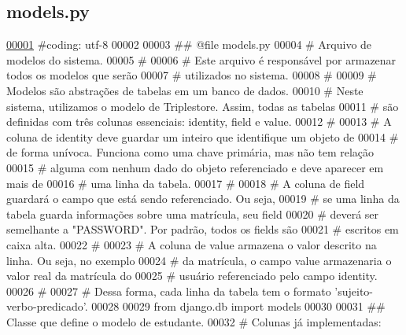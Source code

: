 \hypertarget{ELO_2models_8py_source}{}\subsection{models.\+py}
\label{ELO_2models_8py_source}

\begin{DoxyCode}
\hypertarget{ELO_2models_8py_source_l00001}{}\hyperlink{namespaceELO_1_1models}{00001} \textcolor{comment}{#coding: utf-8}
00002 
00003 \textcolor{comment}{## @file models.py}
00004 \textcolor{comment}{#   Arquivo de modelos do sistema.}
00005 \textcolor{comment}{#}
00006 \textcolor{comment}{#   Este arquivo é responsável por armazenar todos os modelos que serão}
00007 \textcolor{comment}{#   utilizados no sistema.}
00008 \textcolor{comment}{#}
00009 \textcolor{comment}{#   Modelos são abstrações de tabelas em um banco de dados.}
00010 \textcolor{comment}{#   Neste sistema, utilizamos o modelo de Triplestore. Assim, todas as tabelas}
00011 \textcolor{comment}{#   são definidas com três colunas essenciais: identity, field e value.}
00012 \textcolor{comment}{#   }
00013 \textcolor{comment}{#   A coluna de identity deve guardar um inteiro que identifique um objeto de}
00014 \textcolor{comment}{#   de forma unívoca. Funciona como uma chave primária, mas não tem relação}
00015 \textcolor{comment}{#   alguma com nenhum dado do objeto referenciado e deve aparecer em mais de}
00016 \textcolor{comment}{#   uma linha da tabela.}
00017 \textcolor{comment}{#}
00018 \textcolor{comment}{#   A coluna de field guardará o campo que está sendo referenciado. Ou seja,}
00019 \textcolor{comment}{#   se uma linha da tabela guarda informações sobre uma matrícula, seu field }
00020 \textcolor{comment}{#   deverá  ser semelhante a "PASSWORD". Por padrão, todos os fields são}
00021 \textcolor{comment}{#   escritos em caixa alta.}
00022 \textcolor{comment}{#}
00023 \textcolor{comment}{#   A coluna de value armazena o valor descrito na linha. Ou seja, no exemplo}
00024 \textcolor{comment}{#   da matrícula, o campo value armazenaria o valor real da matrícula do}
00025 \textcolor{comment}{#   usuário referenciado pelo campo identity.}
00026 \textcolor{comment}{#}
00027 \textcolor{comment}{#   Dessa forma, cada linha da tabela tem o formato 'sujeito-verbo-predicado'.}
00028 
00029 \textcolor{keyword}{from} django.db \textcolor{keyword}{import} models
00030 
00031 \textcolor{comment}{## Classe que define o modelo de estudante.}
00032 \textcolor{comment}{#   Colunas já implementadas:}

\end{DoxyCode}
